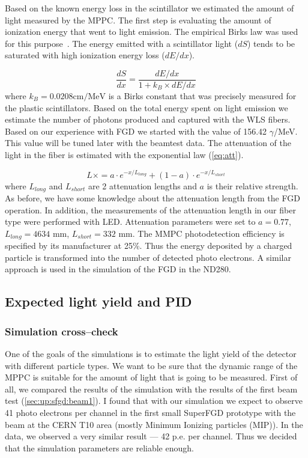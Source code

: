 \documentclass[main.tex]{subfiles}
\begin{document}
Based on the known energy loss in the scintillator we estimated the amount of light measured by the MPPC. The first step is evaluating the amount of ionization energy that went to light emission. The empirical Birks law was used for this purpose~\cite{Birks1951}. The energy emitted with a scintillator light ($dS$) tends to be saturated with high ionization energy loss ($dE/dx$).

\begin{equation}
\frac{dS}{dx}=\frac{dE/dx}{1+k_B\times dE/dx}
\end{equation}
where $k_B=0.0208\text{cm/MeV}$ is a Birks constant that was precisely measured for the plastic scintillators. Based on the total energy spent on light emission we estimate the number of photons produced and captured with the WLS fibers. Based on our experience with FGD we started with the value of 156.42 $\gamma$/MeV. This value will be tuned later with the beamtest data. The attenuation of the light in the fiber is estimated with the exponential law (\autoref{eq:att}).

\begin{equation}
\label{eq:att}
L\times=a\cdot e^{-x/L_{long}}+(1-a)\cdot e^{-x/L_{short}}
\end{equation}
where $L_{long}$ and $L_{short}$ are 2 attenuation lengths and $a$ is their relative strength. As before, we have some knowledge about the attenuation length from the FGD operation. In addition, the measurements of the attenuation length in our fiber type were performed with LED. Attenuation parameters were set to $a=0.77$, $L_{long}=4634$ mm, $L_{short}=332$ mm. The MMPC photodetection efficiency is specified by its manufacturer at 25\%. Thus the energy deposited by a charged particle is transformed into the number of detected photo electrons. A similar approach is used in the simulation of the FGD in the ND280.

\subsection{Expected light yield and PID}
\subsubsection{Simulation cross--check}
One of the goals of the simulations is to estimate the light yield of the detector with different particle types. We want to be sure that the dynamic range of the MPPC is suitable for the amount of light that is going to be measured. First of all, we compared the results of the simulation with the results of the first beam test (\autoref{sec:up:sfgd:beam1}). I found that with our simulation we expect to observe 41 photo electrons per channel in the first small SuperFGD prototype with the beam at the CERN T10 area (mostly Minimum Ionizing particles (MIP)). In the data, we observed a very similar result --- 42 p.e. per channel. Thus we decided that the simulation parameters are reliable enough.
\end{document}
